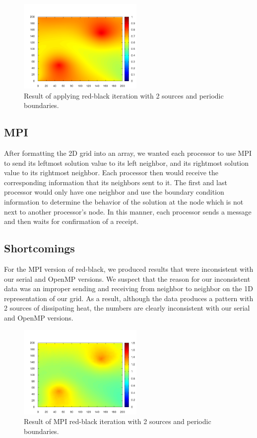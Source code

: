 \documentclass[paper=a4, fontsize=11pt]{scrartcl} %
\numberwithin{equation}{section} %
\numberwithin{figure}{section} %
\numberwithin{table}{section} %
\begin{document}
\begin{figure}
\includegraphics[width=60mm]{redblack-heatmap-2-source-periodic.png}
\caption{Result of applying red-black iteration with 2 sources and periodic boundaries.}
\label{fig:redblack-heatmap}
\end{figure}

\subsection{MPI}
After formatting the 2D grid into an array, we wanted each processor to use MPI to send its leftmost solution value to its left neighbor, and its rightmost solution value to its rightmost neighbor. Each processor then would receive the corresponding information that its neighbors sent to it. The first and last processor would only have one neighbor and use the boundary condition information to determine the behavior of the solution at the node which is not next to another processor's node. In this manner, each processor sends a message and then waits for confirmation of a receipt.

\subsection{Shortcomings}
For the MPI version of red-black, we produced results that were inconsistent with our serial and OpenMP versions. We suspect that the reason for our inconsistent data was an improper sending and receiving from neighbor to neighbor on the 1D representation of our grid. As a result, although the data produces a pattern with 2 sources of dissipating heat, the numbers are clearly inconsistent with our serial and OpenMP versions.

\begin{figure}
\includegraphics[width=60mm]{incorrect-mpi-data.png}
\caption{Result of MPI red-black iteration with 2 sources and periodic boundaries.}
\label{fig:redblack-incorrect-mpi-heatmap}
\end{figure}
\end{document}
